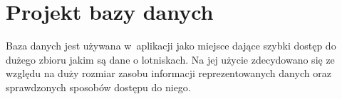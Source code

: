 \documentclass[12pt, twoside]{report}
\begin{document}

\section{Projekt bazy danych}
Baza danych jest używana w~aplikacji jako miejsce dające szybki dostęp do dużego zbioru jakim są dane o lotniskach. Na jej użycie zdecydowano się ze względu na duży rozmiar zasobu informacji reprezentowanych danych oraz sprawdzonych sposobów dostępu do niego.

\end{document}
